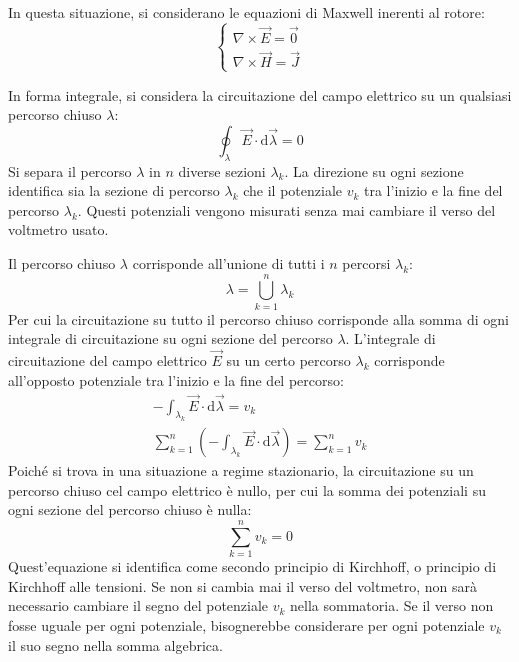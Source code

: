 \documentclass{article}
\newcommand{\df}{\mathrm{d}}
\numberwithin{equation}{subsection}
\begin{document}
In questa situazione, si considerano le equazioni di Maxwell inerenti al rotore:
\begin{equation*}
    \begin{cases}
        \nabla\times\vec{E}=\vec0\\
        \nabla\times\vec{H}=\vec{J}
    \end{cases}
\end{equation*}


In forma integrale, si considera la circuitazione del campo elettrico su un qualsiasi percorso chiuso $\lambda$:
\begin{equation*}
    \displaystyle\oint_{\lambda}\vec{E}\cdot \df\vec{\lambda}=0
\end{equation*}
Si separa il percorso $\lambda$ in $n$ diverse sezioni $\lambda_k$. La direzione su ogni sezione identifica sia la sezione di percorso $\lambda_k$ che il potenziale $v_k$ tra 
l'inizio e la fine del percorso $\lambda_k$. Questi potenziali vengono misurati senza mai cambiare il verso del voltmetro usato. 

Il percorso chiuso $\lambda$ corrisponde all'unione di tutti i $n$ percorsi $\lambda_k$:
\begin{equation*}
    \lambda=\bigcup_{k=1}^n\lambda_k
\end{equation*}
Per cui la circuitazione su tutto il percorso chiuso corrisponde alla somma di ogni integrale di circuitazione su ogni sezione del percorso $\lambda$. L'integrale di circuitazione 
del campo elettrico $\vec{E}$ su un certo percorso $\lambda_k$ corrisponde all'opposto potenziale tra l'inizio e la fine del percorso:
\begin{gather*}
    -\int_{\lambda_k}\vec{E}\cdot \df\vec{\lambda}=v_k\\
    \displaystyle\sum_{k=1}^n\left(-\int_{\lambda_k}\vec{E}\cdot \df\vec{\lambda}\right)=\sum_{k=1}^nv_k
\end{gather*}
Poiché si trova in una situazione a regime stazionario, la circuitazione su un percorso chiuso cel campo elettrico è nullo, per cui la somma dei potenziali su ogni sezione 
del percorso chiuso è nulla:
\begin{equation}
    \displaystyle\sum_{k=1}^nv_k=0
\end{equation}
Quest'equazione si identifica come secondo principio di Kirchhoff, o principio di Kirchhoff alle tensioni. 
Se non si cambia mai il verso del voltmetro, non sarà necessario cambiare il segno del potenziale $v_k$ nella sommatoria. Se il verso non fosse uguale per ogni potenziale, 
bisognerebbe considerare per ogni potenziale $v_k$ il suo segno nella somma algebrica. 
\end{document}
